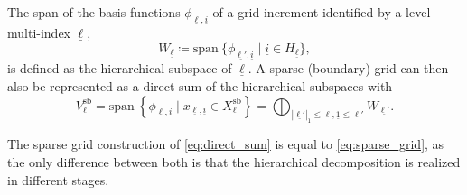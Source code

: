 \documentclass[
  a4paper,  %
  twoside,  %
  bibliography=totoc,
  headsepline,
  cleardoublepage=empty,
  parskip=half,
  draft=false
]{scrbook}
\begin{document}
\begin{definition}
The span of the basis functions $\phi_{\underline{\ell},\underline{i}}$ of a grid increment identified by a level multi-index $\underline{\ell}$,
\begin{equation}
W_{\underline{\ell}} \coloneqq \mathrm{span}~ \{\phi_{\underline{\ell'},\underline{i}} \mid \underline{i} \in H_{\underline{\ell}}\},
\end{equation}
is defined as the hierarchical subspace of $\underline{\ell}$.
A sparse (boundary) grid can then also be represented as a direct sum of the hierarchical subspaces with
\begin{equation}
V^{\mathrm{sb}}_{\ell} = \mathrm{span}~ \left\{\phi_{\underline{\ell},\underline{i}} \mid x_{\underline{\ell},\underline{i}} \in X^{\mathrm{sb}}_{\ell}\right\}=\bigoplus_{|\underline{\ell'}|_1 \leq \ell, \underline{1} \leq \ell'} W_{\underline{\ell'}}.
\label{eq:direct_sum}
\end{equation}
\end{definition}
%
The sparse grid construction of \cref{eq:direct_sum} is equal to \cref{eq:sparse_grid}, as the only difference between both is that the hierarchical decomposition is realized in different stages.
\end{document}
